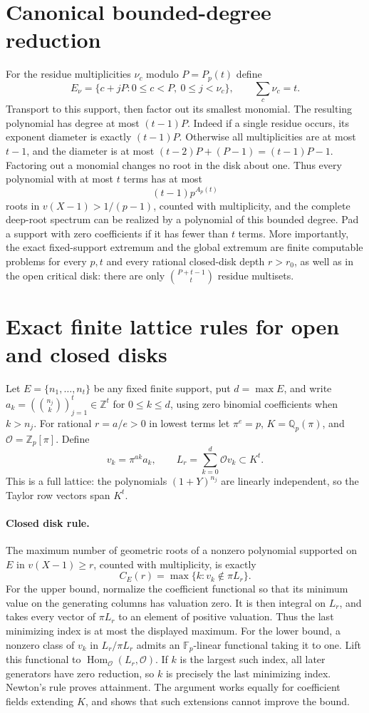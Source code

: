 \section{Canonical bounded-degree reduction}
For the residue multiplicities $\nu_c$ modulo $P=P_p(t)$ define
\[
 E_\nu=\{c+jP:0\le c<P,\ 0\le j<\nu_c\},\qquad \sum_c\nu_c=t.
\]
Transport to this support, then factor out its smallest monomial.
The resulting polynomial has degree at most $(t-1)P$. Indeed if a single
residue occurs, its exponent diameter is exactly $(t-1)P$. Otherwise
all multiplicities are at most $t-1$, and the diameter is at most
$(t-2)P+(P-1)=(t-1)P-1$. Factoring out a monomial changes no root in the
disk about one. Thus every polynomial with at most $t$ terms has at most
\[
 (t-1)p^{A_p(t)}
\]
roots in $v(X-1)>1/(p-1)$, counted with multiplicity, and the complete
deep-root spectrum can be realized by a polynomial of this bounded
degree. Pad a support with zero coefficients if it has fewer than $t$
terms. More importantly, the exact fixed-support extremum and the global
extremum are finite computable problems for every $p,t$ and every rational
closed-disk depth $r>r_0$, as well as in the open critical disk:
there are only $\binom{P+t-1}{t}$ residue multisets.

\section{Exact finite lattice rules for open and closed disks}
Let $E=\{n_1,\ldots,n_t\}$ be any fixed finite support, put $d=\max E$, and
write $a_k=(\binom{n_j}{k})_{j=1}^t\in\mathbb Z^t$ for $0\le k\le d$,
using zero binomial coefficients when $k>n_j$.
For rational $r=a/e>0$ in lowest terms let $\pi^e=p$,
$K=\mathbb Q_p(\pi)$, and $\mathcal O=\mathbb Z_p[\pi]$. Define
\[
 v_k=\pi^{ak}a_k,\qquad L_r=\sum_{k=0}^d\mathcal O v_k\subset K^t.
\]
This is a full lattice: the polynomials $(1+Y)^{n_j}$ are linearly
independent, so the Taylor row vectors span $K^t$.

\paragraph{Closed disk rule.}
The maximum number of geometric roots of a nonzero polynomial supported
on $E$ in $v(X-1)\ge r$, counted with multiplicity, is exactly
\[
 C_E(r)=\max\{k:v_k\notin\pi L_r\}.
\]
For the upper bound, normalize the coefficient functional so that its
minimum value on the generating columns has valuation zero. It is then
integral on $L_r$, and takes every vector of $\pi L_r$ to an element of
positive valuation. Thus the last minimizing index is at most the
displayed maximum. For the lower bound, a nonzero class of $v_k$ in
$L_r/\pi L_r$ admits an $\mathbb F_p$-linear functional taking it to one.
Lift this functional to $\operatorname{Hom}_{\mathcal O}(L_r,\mathcal O)$.
If $k$ is the largest such index, all later generators have zero
reduction, so $k$ is precisely the last minimizing index. Newton's rule
proves attainment. The argument works equally for coefficient fields
extending $K$, and shows that such extensions cannot improve the bound.

